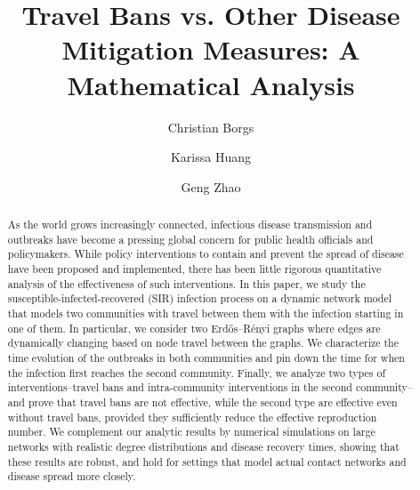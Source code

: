 \documentclass[11pt]{article}
\title{Travel Bans vs. Other Disease Mitigation Measures: A Mathematical Analysis}
\author[1, 3]{Christian Borgs}
\author[2]{Karissa Huang}
\author[1]{Geng Zhao}
\date{}
\affil[1]{Department of Electrical Engineering and Computer Sciences, UC Berkeley}
\affil[2]{Department of Statistics, UC Berkeley}
\affil[3]{Bakar Institute of Digital Materials for the Planet}
\begin{document}
\maketitle


\begin{abstract}
As the world grows increasingly connected, infectious disease transmission and outbreaks have become a pressing global concern for public health officials and policymakers. While policy interventions to contain and prevent the spread of disease have been proposed and implemented, there has been little rigorous quantitative analysis of the effectiveness of such interventions. In this paper, we study the susceptible-infected-recovered (SIR) infection process on a dynamic network model that models two communities with travel between them with the infection starting in one of them. In particular, we consider two Erd\H{o}s--R\'enyi graphs where edges are dynamically changing based on node travel between the graphs. We characterize the time evolution of the outbreaks in both communities and pin down the time for when the infection first reaches the second community. Finally, we analyze two types of interventions--travel bans and intra-community interventions in the second community--and prove that travel bans are not effective, while the second type are effective even without travel bans, provided they sufficiently reduce the effective reproduction number. We complement our analytic results by numerical simulations on large networks with  realistic degree distributions and disease recovery times, showing that these results are robust, and hold for settings that model actual contact networks and disease spread more closely.
\end{abstract}


\end{document}
